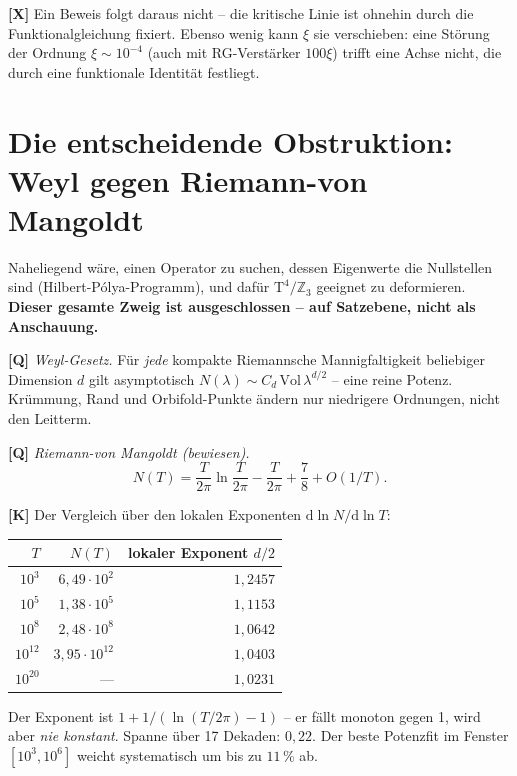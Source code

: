 \textbf{[X]} Ein Beweis folgt daraus nicht -- die kritische Linie ist
ohnehin durch die Funktionalgleichung fixiert. Ebenso wenig kann $\xi$
sie verschieben: eine St\"orung der Ordnung $\xi \sim 10^{-4}$ (auch mit
RG-Verst\"arker $100\xi$) trifft eine Achse nicht, die durch eine
funktionale Identit\"at festliegt.

\section{Die entscheidende Obstruktion: Weyl gegen Riemann-von Mangoldt}
\label{sec:weyl}

Naheliegend w\"are, einen Operator zu suchen, dessen Eigenwerte die
Nullstellen sind (Hilbert-P\'olya-Programm), und daf\"ur
$\text{T}^4/\mathbb{Z}_3$ geeignet zu deformieren. \textbf{Dieser
gesamte Zweig ist ausgeschlossen -- auf Satzebene, nicht als
Anschauung.}

\textbf{[Q]} \emph{Weyl-Gesetz.} F\"ur \emph{jede} kompakte Riemannsche
Mannigfaltigkeit beliebiger Dimension $d$ gilt asymptotisch
$N(\lambda) \sim C_d\,\text{Vol}\,\lambda^{d/2}$ -- eine reine Potenz.
Kr\"ummung, Rand und Orbifold-Punkte \"andern nur niedrigere Ordnungen,
nicht den Leitterm.

\textbf{[Q]} \emph{Riemann-von Mangoldt (bewiesen).}
\[
  N(T) = \frac{T}{2\pi}\ln\frac{T}{2\pi} - \frac{T}{2\pi}
  + \frac78 + O(1/T).
\]

\textbf{[K]} Der Vergleich \"uber den lokalen Exponenten
$\mathrm d\ln N/\mathrm d\ln T$:

\begin{center}
\begin{tabular}{rrr}
\toprule
$T$ & $N(T)$ & lokaler Exponent $d/2$ \\
\midrule
$10^{3}$ & $6{,}49\cdot10^{2}$ & $1{,}2457$ \\
$10^{5}$ & $1{,}38\cdot10^{5}$ & $1{,}1153$ \\
$10^{8}$ & $2{,}48\cdot10^{8}$ & $1{,}0642$ \\
$10^{12}$ & $3{,}95\cdot10^{12}$ & $1{,}0403$ \\
$10^{20}$ & --- & $1{,}0231$ \\
\bottomrule
\end{tabular}
\end{center}

Der Exponent ist $1 + 1/(\ln(T/2\pi) - 1)$ -- er f\"allt monoton gegen 1, wird
aber \emph{nie konstant}. Spanne \"uber 17 Dekaden: $0{,}22$. Der beste
Potenzfit im Fenster $[10^3, 10^6]$ weicht systematisch um bis zu
$11\,\%$ ab.

